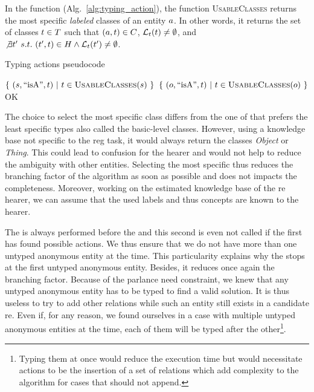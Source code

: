 In the \typingactions{} function (Alg.~\ref{alg:typing_action}), the function \textsc{UsableClasses} returns the most specific \textit{labeled} classes of an entity $a$. In other words, it returns the set of classes $t \in T$ such that $(a,t) \in C$, $\mathcal{L}_t(t) \neq \emptyset$, and
$\not\exists t'\ s.t.\ (t', t) \in H \wedge \mathcal{L}_t(t') \neq \emptyset$.

\begin{algorithm}[ht!]
\caption{\label{alg:typing_action} Typing actions pseudocode}
\begin{algorithmic}

        
                \State \Return $\{\ (s,\text{``isA''},t)\ |\ t \in \textsc{UsableClasses}(s)\  \}$
                \State \Return $\{\ (o,\text{``isA''},t)\ |\ t \in \textsc{UsableClasses}(o)\  \}$
            \EndIf
        \EndFor
        \Return OK 
    \EndFunction
\end{algorithmic}
\end{algorithm}

The choice to select the most specific class differs from the one of \cite{dale_1995_computational} that prefers the least specific types also called the basic-level classes. However, using a knowledge base not specific to the \acrshort{reg} task, it would always return the classes \textit{Object} or \textit{Thing}. This could lead to confusion for the hearer and would not help to reduce the ambiguity with other entities. Selecting the most specific thus reduces the branching factor of the algorithm as soon as possible and does not impacts the completeness. Moreover, working on the estimated knowledge base of the \acrshort{re} hearer, we can assume that the used labels and thus concepts are known to the hearer.

The \typingactions{} is always performed before the \differenceactions{} and this second is even not called if the first has found possible actions. We thus ensure that we do not have more than one untyped anonymous entity at the time. This particularity explains why the \typingactions{} stops at the first untyped anonymous entity. Besides, it reduces once again the branching factor. Because of the parlance need constraint, we knew that any untyped anonymous entity has to be typed to find a valid solution. It is thus useless to try to add other relations while such an entity still exists in a candidate \acrshort{re}. Even if, for any reason, we found ourselves in a case with multiple untyped anonymous entities at the time, each of them will be typed after the other\footnote{Typing them at once would reduce the execution time but would necessitate actions to be the insertion of a set of relations which add complexity to the algorithm for cases that should not append.}.

